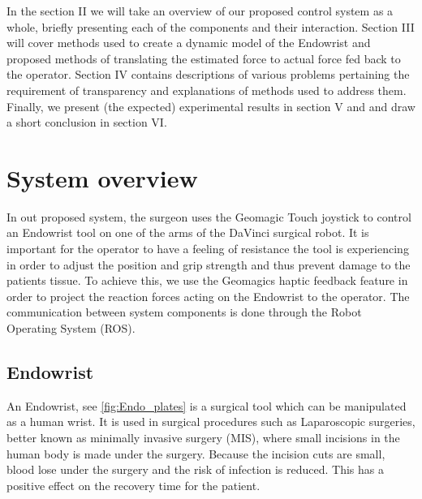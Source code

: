 \documentclass[conference]{IEEEtran}
\begin{document}
In the section II we will take an overview of our proposed control system as a whole, briefly presenting each of the components and their interaction.
Section III will cover methods used to create a dynamic model of the Endowrist and proposed methods of translating the estimated force to actual force fed back to the operator.
Section IV contains descriptions of various problems pertaining the requirement of transparency and explanations of methods used to address them.
Finally,  we present (the expected) experimental results in section V and and draw a short conclusion in section VI.

 
 \section{System overview}
In out proposed system, the surgeon uses the Geomagic Touch joystick to control an Endowrist tool on one of the arms of the DaVinci surgical robot.
It is important for the operator to have a feeling of resistance the tool is experiencing in order to adjust the position and grip strength and thus prevent damage to the patients tissue.
To achieve this, we use the Geomagics haptic feedback feature in order to project the reaction forces acting on the Endowrist to the operator. 
The communication between system components is done through the Robot Operating System (ROS).

\subsection{Endowrist}
An Endowrist, see \ref{fig:Endo_plates} is a surgical tool which can be manipulated as a human wrist. 
It is used in surgical procedures such as Laparoscopic surgeries, better known as minimally invasive surgery (MIS), where small incisions in the human body is made under the surgery. 
Because the incision cuts are small, blood lose under the surgery and the risk of infection is reduced. This has a positive effect on the recovery time for the patient.
\end{document}

